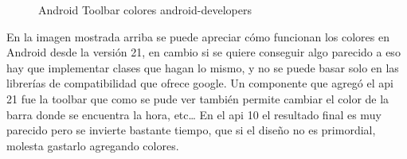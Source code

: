 \begin{figure}[H] 
  \begin{center} 
    \caption{Android Toolbar colores android-developers} 
    \label{fig:AndroidToolbar} 
  \end{center} 
\end{figure}

En la imagen mostrada arriba se puede apreciar cómo funcionan los colores en Android desde la versión 21, en cambio si se quiere conseguir algo parecido a eso hay que implementar clases que hagan lo mismo, y no se puede basar solo en las librerías de compatibilidad que ofrece google.
Un componente que agregó el api 21 fue la toolbar que como se pude ver también permite cambiar el color de la barra donde se encuentra la hora, etc…
En el api 10 el resultado final es muy parecido pero se invierte bastante tiempo, que si el diseño no es primordial, molesta gastarlo agregando colores.

